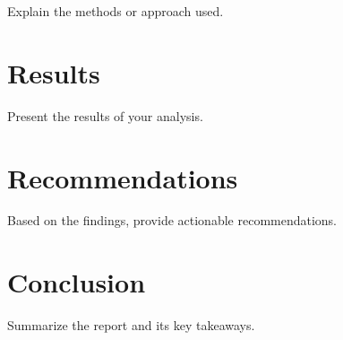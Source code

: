 \documentclass[12pt]{report}
\begin{document}
Explain the methods or approach used.

\chapter{Results}

Present the results of your analysis.

\chapter{Recommendations}

Based on the findings, provide actionable recommendations.

\chapter{Conclusion}

Summarize the report and its key takeaways.
\end{document}
